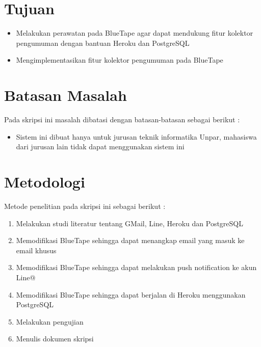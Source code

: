 \section{Tujuan}
\label{sec:tujuan}
\begin{itemize}
\item Melakukan perawatan pada BlueTape agar dapat mendukung fitur kolektor pengumuman dengan bantuan Heroku dan PostgreSQL
\item Mengimplementasikan fitur kolektor pengumuman pada BlueTape
\end{itemize}

\section{Batasan Masalah}
\label{sec:batasan}
Pada skripsi ini masalah dibatasi dengan batasan-batasan sebagai berikut :
\begin{itemize}
\item Sistem ini dibuat hanya untuk jurusan teknik informatika Unpar, mahasiswa dari jurusan lain tidak dapat menggunakan sistem ini
\end{itemize}


\section{Metodologi}
\label{sec:metodepenelitian}
Metode penelitian pada skripsi ini sebagai berikut :
	\begin{enumerate}
		\item Melakukan studi literatur tentang GMail, Line, Heroku dan PostgreSQL
		\item Memodifikasi BlueTape sehingga dapat menangkap email yang masuk ke email khusus
		\item Memodifikasi BlueTape sehingga dapat melakukan push notification ke akun Line@
		\item Memodifikasi BlueTape sehingga dapat berjalan di Heroku menggunakan PostgreSQL
		\item Melakukan pengujian
		\item Menulis dokumen skripsi
	\end{enumerate}


